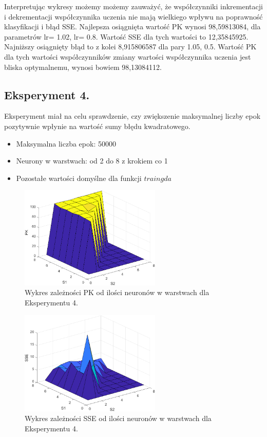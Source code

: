 \documentclass[a4paper, openright, twoside,11pt]{article}
\begin{document}
        Interpretując wykresy możemy możemy zauważyć, że współczynniki inkrementacji i dekrementacji współczynnika uczenia nie mają wielkiego wpływu na poprawność klasyfikacji i błąd SSE. Najlepsza osiągnięta wartość PK wynosi 98,59813084, dla parametrów lr\textunderscoreinc = 1.02, lr\textunderscoredec = 0.8. Wartość SSE dla tych wartości to 12,35845925.\\
        Najniższy osiągnięty błąd to z kolei 8,915806587 dla pary 1.05, 0.5. Wartość PK dla tych wartości współczynników zmiany wartości współczynnika uczenia jest bliska optymalnemu, wynosi bowiem 98,13084112.
    
    \clearpage
    \subsection{Eksperyment 4.}
    Eksperyment miał na celu sprawdzenie, czy zwiększenie maksymalnej liczby epok pozytywnie wpłynie na wartość sumy błędu kwadratowego.
    \begin{itemize}
        \item Maksymalna liczba epok: 50000
        \item Neurony w warstwach: od 2 do 8 z krokiem co 1
        \item Pozostałe wartości domyślne dla funkcji $traingda$
    \end{itemize}
        \begin{figure}[!h]
            \centering
            \includegraphics[width = 0.6\textwidth]{Grafika/eksperymenty/pk4.png}
            \caption {Wykres zależności PK od ilości neuronów w warstwach dla Eksperymentu 4.}
            \label{fig:PKeksperyment4}
        \end{figure}
        \begin{figure}[!h]
            \centering
            \includegraphics[width = 0.6\textwidth]{Grafika/eksperymenty/sse4.png}
            \caption {Wykres zależności SSE od ilości neuronów w warstwach dla Eksperymentu 4.}
            \label{fig:PKeksperyment4}
        \end{figure}   
\end{document}
